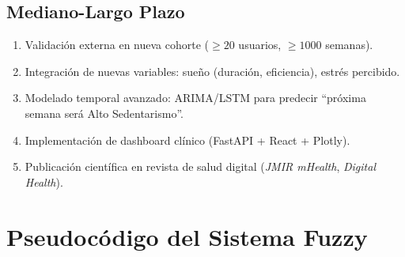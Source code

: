 \documentclass[12pt,a4paper,twoside]{article}
\begin{document}
\subsection{Mediano-Largo Plazo}
\begin{enumerate}
    \item Validación externa en nueva cohorte ($\geq 20$ usuarios, $\geq 1000$ semanas).
    \item Integración de nuevas variables: sueño (duración, eficiencia), estrés percibido.
    \item Modelado temporal avanzado: ARIMA/LSTM para predecir ``próxima semana será Alto Sedentarismo''.
    \item Implementación de dashboard clínico (FastAPI + React + Plotly).
    \item Publicación científica en revista de salud digital (\textit{JMIR mHealth}, \textit{Digital Health}).
\end{enumerate}






\appendix

\section{Pseudocódigo del Sistema Fuzzy}
\end{document}

